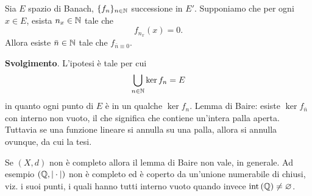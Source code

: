 \begin{exercise}
\label{ex:ptwise_eventually_null_seq}
	Sia $E$ spazio di Banach, $\{f_n\}_{n \in \mathbb{N}}$ successione in $E'$. Supponiamo che per ogni $x \in E$, esista $n_x \in \mathbb{N}$ tale che
	\begin{equation*}
		f_{n_x}(x) = 0.
	\end{equation*}
	Allora esiste $\bar n \in \mathbb{N}$ tale che $f_{\bar n \equiv 0}$.

	\textbf{Svolgimento}. L'ipotesi è tale per cui
	\begin{equation*}
		\bigcup_{n \in \mathbb{N}} \ker f_n = E
	\end{equation*}
	in quanto ogni punto di $E$ è in un qualche $\ker f_n$. Lemma di Baire: esiste $\ker f_{\bar n}$ con interno non vuoto, il che significa che contiene un'intera palla aperta.
	Tuttavia se una funzione lineare si annulla su una palla, allora si annulla ovunque, da cui la tesi.
\end{exercise}

\begin{counterexample}
	Se $(X, d)$ non è completo allora il lemma di Baire non vale, in generale. Ad esempio $(\mathbb{Q}, |\cdot|)$ non è completo ed è coperto da un'unione numerabile di chiusi, viz. i suoi punti, i quali hanno tutti interno vuoto quando invece $\operatorname{int}\left(\mathbb{Q}\right) \neq \varnothing$.
\end{counterexample}

